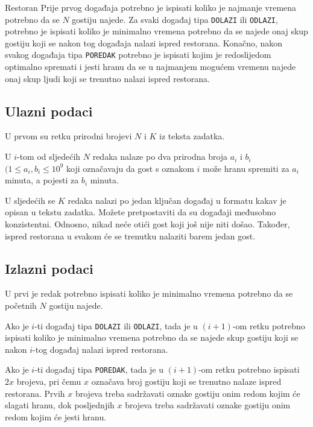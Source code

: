\begin{statement}[
  problempoints=100,
  timelimit=1 sekunda,
  memorylimit=512 MiB,
]{Restoran}
Prije prvog događaja potrebno je ispisati koliko je najmanje vremena potrebno
da se $N$ gostiju najede. Za svaki događaj tipa \texttt{DOLAZI} ili
\texttt{ODLAZI}, potrebno je ispisati koliko je minimalno vremena potrebno da
se najede onaj skup gostiju koji se nakon tog događaja nalazi ispred
restorana. Konačno, nakon svakog događaja tipa \texttt{POREDAK} potrebno je
ispisati kojim je redoslijedom optimalno spremati i jesti hranu da se u
najmanjem mogućem vremenu najede onaj skup ljudi koji se trenutno nalazi
ispred restorana.

\subsection*{Ulazni podaci}
U prvom su retku prirodni brojevi $N$ i $K$ iz teksta zadatka.

U $i$-tom od sljedećih $N$ redaka nalaze po dva prirodna broja $a_i$ i $b_i$
$(1 \le a_i, b_i \le 10^9$ koji označavaju da gost s oznakom $i$ može hranu
spremiti za $a_i$ minuta, a pojesti za $b_i$ minuta.

U sljedećih se $K$ redaka nalazi po jedan ključan događaj u formatu kakav
je opisan u tekstu zadatka. Možete pretpostaviti da su događaji međusobno
konzistentni. Odnosno, nikad neće otići gost koji još nije niti došao. Također,
ispred restorana u svakom će se trenutku nalaziti barem jedan gost.

\clearpage
\subsection*{Izlazni podaci}
U prvi je redak potrebno ispisati koliko je minimalno vremena potrebno da se
početnih $N$ gostiju najede.

Ako je $i$-ti događaj tipa \texttt{DOLAZI} ili \texttt{ODLAZI}, tada je u
$(i+1)$-om retku potrebno ispisati koliko je minimalno vremena potrebno da se
najede skup gostiju koji se nakon $i$-tog događaj nalazi ispred restorana.

Ako je $i$-ti događaj tipa \texttt{POREDAK}, tada je u $(i+1)$-om retku potrebno
ispisati $2x$ brojeva, pri čemu $x$ označava broj gostiju koji se trenutno
nalaze ispred restorana. Prvih $x$ brojeva treba sadržavati oznake gostiju onim
redom kojim će slagati hranu, dok posljednjih $x$ brojeva treba sadržavati
oznake gostiju onim redom kojim će jesti hranu.


\end{statement}
